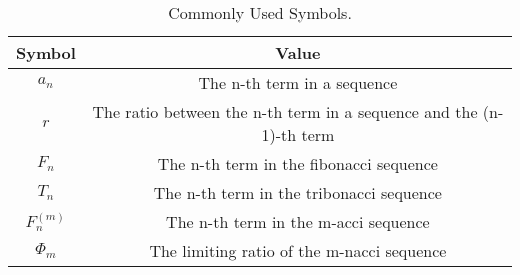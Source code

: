 \begin{table}[h]
    \begin{center}
        \begin{tabular}{ |c|c| } 
        \hline
        \textbf{Symbol} & \textbf{Value} \\
        \hline
        $a_n$ & The n-th term in a sequence \\ 
        \hline
        $r$ & The ratio between the n-th term in a sequence and the (n-1)-th term \\ 
        \hline
        $F_n$ & The n-th term in the fibonacci sequence \\
        \hline
        $T_n$ & The n-th term in the tribonacci sequence \\
        \hline
        $F^{(m)}_n$ & The n-th term in the m-acci sequence \\ 
        \hline
        $\Phi_m$ & The limiting ratio of the m-nacci sequence \\
        \hline
        \end{tabular}
        \caption{Commonly Used Symbols.}
    \label{table:1}
    \end{center}
    \end{table}
